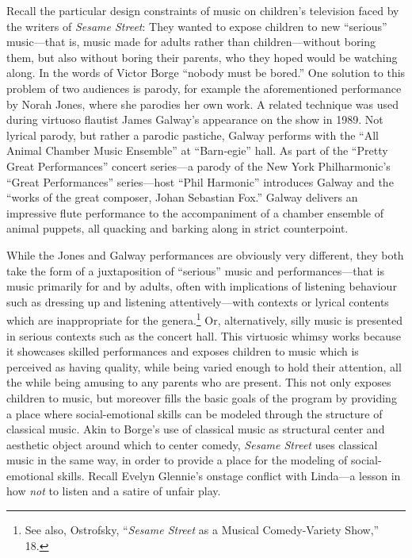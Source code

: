 \documentclass[12pt,letterpaper]{article}
\newcommand{\ses}{\textit{Sesame Street }}
\begin{document}
	Recall the particular design constraints of music on children's
	television faced by the writers of \textit{Sesame Street}: 	
	They wanted to expose children to new ``serious'' music---that is, music
	made for adults rather than children---without boring
	them, but also without boring their parents, who they hoped would be 
	watching along. In the words of Victor Borge ``nobody must
	be bored.'' One solution to this problem of two audiences is parody,
	for example the aforementioned performance by Norah Jones, where she
	parodies her own work. A related technique was used during virtuoso 
	flautist James Galway's appearance on the show in 1989. Not lyrical 
	parody, but rather a parodic pastiche, Galway performs with the ``All 
	Animal Chamber Music Ensemble'' at ``Barn-egie'' hall. As part of the 
	``Pretty Great Performances'' concert series---a parody of the New York
	Philharmonic's ``Great Performances'' series---host ``Phil Harmonic'' 
	introduces Galway and the ``works of the great composer, Johan Sebastian
	Fox.'' Galway delivers an impressive flute 
	performance to the accompaniment of a chamber ensemble of animal 
	puppets, all quacking and barking along in strict 
	counterpoint.\autocite{Galway2}

        While the Jones and Galway performances are obviously very different, 
	they both take the form of a juxtaposition of ``serious'' music and 
	performances---that is music primarily for and by adults, often with
	implications of listening behaviour such as dressing up and listening 
	attentively---with contexts or lyrical contents which are inappropriate 
	for the genera.\footnote{See also, Ostrofsky,  ``\textit{Sesame Street}
	as a Musical Comedy-Variety Show,'' 18.} Or, alternatively, silly music
	is presented in serious contexts such as the concert hall. This 
	virtuosic whimsy 
	works because it showcases skilled performances and exposes children to
	music which is perceived as having quality, while being varied enough 
	to hold their attention, all the while being amusing to any parents who 
	are present. This not only exposes children to music, but moreover fills
	the basic goals of the program by providing a place where 
	social-emotional skills can be modeled through the structure of
	classical music. Akin to Borge's use of classical music as structural
	center and aesthetic object around which to center comedy, \ses 
	uses classical music in the same way, in order to provide a place for
	the modeling of social-emotional skills. Recall Evelyn Glennie's 
	onstage conflict with Linda---a lesson in how \textit{not} to listen
	and a satire of unfair play. 
\end{document}
